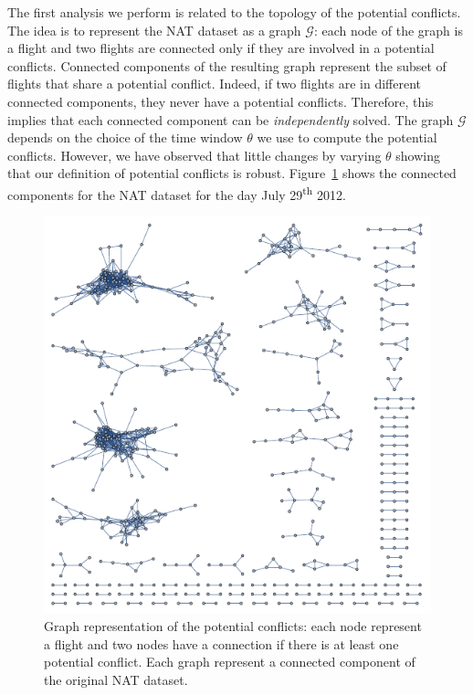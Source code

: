\documentclass[twocolumn,9pt]{article}
\renewcommand{\figurename}{Figure}
\begin{document}
The first analysis we perform is related to the topology of the potential conflicts. The idea is to represent
the NAT dataset as a graph $\mathcal{G}$: each node of the graph is a flight and two flights are connected only if they
are involved in a potential conflicts. Connected components of the resulting graph represent the subset
of flights that share a potential conflict. Indeed, if two flights are in different connected components,
they never have a potential conflicts. Therefore, this implies that each connected component can be 
\emph{independently} solved. The graph $\mathcal{G}$ depends on the choice of the time window $\theta$
we use to compute the potential conflicts. However, we have observed that little changes by varying $\theta$ showing
that our definition of potential conflicts is robust. \figurename~\ref{fig:graph} shows the connected components
for the NAT dataset for the day July 29\textsuperscript{th} 2012.
%
\begin{figure}[h!]
\centering
\includegraphics[scale=0.6]{images/atm_graph.pdf}
\caption{\label{fig:graph}Graph representation of the potential conflicts: each node represent a flight
and two nodes have a connection if there is at least one potential conflict. Each graph represent a connected
component of the original NAT dataset.}
\end{figure}
\end{document}
